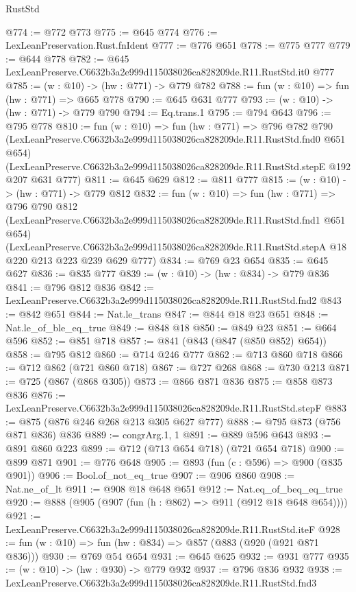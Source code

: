 \begin{lexlean}{RustStd}
\begin{coremodule}
@774 := @772 @773
@775 := @645 @774
@776 := LexLeanPreservation.Rust.fnIdent
@777 := @776 @651
@778 := @775 @777
@779 := @644 @778
@782 := @645 LexLeanPreserve.C6632b3a2e999d115038026ca828209de.R11.RustStd.it0 @777
@785 := (w : @10) -> (hw : @771) -> @779 @782
@788 := fun (w : @10) => fun (hw : @771) => @665 @778
@790 := @645 @631 @777
@793 := (w : @10) -> (hw : @771) -> @779 @790
@794 := Eq.trans.{1}
@795 := @794 @643
@796 := @795 @778
@810 := fun (w : @10) =>
  fun (hw : @771) =>
  @796
    @782
    @790
    (LexLeanPreserve.C6632b3a2e999d115038026ca828209de.R11.RustStd.fnd0 @651 @654)
    (LexLeanPreserve.C6632b3a2e999d115038026ca828209de.R11.RustStd.stepE @192 @207 @631 @777)
@811 := @645 @629
@812 := @811 @777
@815 := (w : @10) -> (hw : @771) -> @779 @812
@832 := fun (w : @10) =>
  fun (hw : @771) =>
  @796
    @790
    @812
    (LexLeanPreserve.C6632b3a2e999d115038026ca828209de.R11.RustStd.fnd1 @651 @654)
    (LexLeanPreserve.C6632b3a2e999d115038026ca828209de.R11.RustStd.stepA
      @18
      @220
      @213
      @223
      @239
      @629
      @777)
@834 := @769 @23 @654
@835 := @645 @627
@836 := @835 @777
@839 := (w : @10) -> (hw : @834) -> @779 @836
@841 := @796 @812 @836
@842 := LexLeanPreserve.C6632b3a2e999d115038026ca828209de.R11.RustStd.fnd2
@843 := @842 @651
@844 := Nat.le_trans
@847 := @844 @18 @23 @651
@848 := Nat.le_of_ble_eq_true
@849 := @848 @18
@850 := @849 @23
@851 := @664 @596
@852 := @851 @718
@857 := @841 (@843 (@847 (@850 @852) @654))
@858 := @795 @812
@860 := @714 @246 @777
@862 := @713 @860 @718
@866 := @712 @862 (@721 @860 @718)
@867 := @727 @268
@868 := @730 @213
@871 := @725 (@867 (@868 @305))
@873 := @866 @871 @836
@875 := @858 @873 @836
@876 := LexLeanPreserve.C6632b3a2e999d115038026ca828209de.R11.RustStd.stepF
@883 := @875 (@876 @246 @268 @213 @305 @627 @777)
@888 := @795 @873 (@756 @871 @836) @836
@889 := congrArg.{1, 1}
@891 := @889 @596 @643
@893 := @891 @860 @223
@899 := @712 (@713 @654 @718) (@721 @654 @718)
@900 := @899 @871
@901 := @776 @648
@905 := @893 (fun (c : @596) => @900 (@835 @901))
@906 := Bool.of_not_eq_true
@907 := @906 @860
@908 := Nat.ne_of_lt
@911 := @908 @18 @648 @651
@912 := Nat.eq_of_beq_eq_true
@920 := @888 (@905 (@907 (fun (h : @862) => @911 (@912 @18 @648 @654))))
@921 := LexLeanPreserve.C6632b3a2e999d115038026ca828209de.R11.RustStd.iteF
@928 := fun (w : @10) => fun (hw : @834) => @857 (@883 (@920 (@921 @871 @836)))
@930 := @769 @54 @654
@931 := @645 @625
@932 := @931 @777
@935 := (w : @10) -> (hw : @930) -> @779 @932
@937 := @796 @836 @932
@938 := LexLeanPreserve.C6632b3a2e999d115038026ca828209de.R11.RustStd.fnd3

\end{coremodule}
\end{lexlean}
